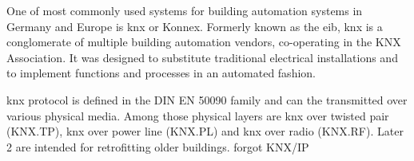 One of most commonly used systems for building automation systems in Germany and Europe is \Gls{knx} or Konnex. Formerly known as the \gls{eib}, \gls{knx} is a \alert{conglomerate} of multiple building automation vendors, co-operating in the KNX Association. 
It was designed to substitute traditional electrical installations and to implement functions and processes in an automated fashion. \parencite{Merz2009}

\Gls{knx} protocol is defined in the DIN EN 50090 family and can the transmitted over various physical media. Among those physical layers are \gls{knx} over twisted pair (KNX.TP), \gls{knx} over power line (KNX.PL) and \gls{knx} over radio (KNX.RF). Later 2 are intended for retrofitting older buildings. \parencite{Merz2009}
\alert{forgot KNX/IP}

